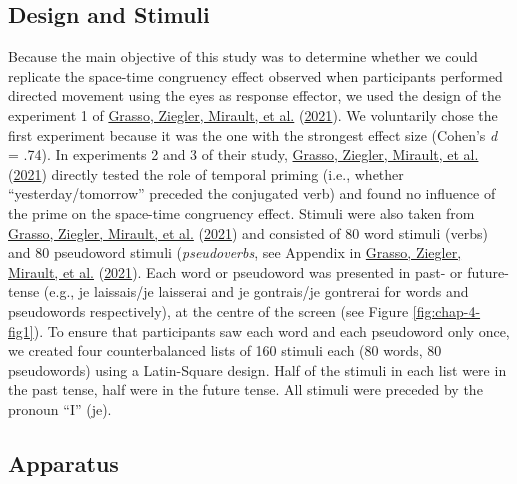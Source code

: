 \documentclass[
  a4paper,12pt,twoside,onecolumn,openright,final,oldfontcommands]{memoir}
\begin{document}
\hypertarget{design-and-stimuli-1}{%
\subsection{Design and Stimuli}\label{design-and-stimuli-1}}

Because the main objective of this study was to determine whether we could replicate the space-time congruency effect observed when participants performed directed movement using the eyes as response effector, we used the design of the experiment 1 of \protect\hyperlink{ref-grasso_as_2021}{Grasso, Ziegler, Mirault, et al.} (\protect\hyperlink{ref-grasso_as_2021}{2021}). We voluntarily chose the first experiment because it was the one with the strongest effect size (Cohen's \emph{d} = .74). In experiments 2 and 3 of their study, \protect\hyperlink{ref-grasso_as_2021}{Grasso, Ziegler, Mirault, et al.} (\protect\hyperlink{ref-grasso_as_2021}{2021}) directly tested the role of temporal priming (i.e., whether ``yesterday/tomorrow'' preceded the conjugated verb) and found no influence of the prime on the space-time congruency effect. Stimuli were also taken from \protect\hyperlink{ref-grasso_as_2021}{Grasso, Ziegler, Mirault, et al.} (\protect\hyperlink{ref-grasso_as_2021}{2021}) and consisted of 80 word stimuli (verbs) and 80 pseudoword stimuli (\emph{pseudoverbs}, see Appendix in \protect\hyperlink{ref-grasso_as_2021}{Grasso, Ziegler, Mirault, et al.} (\protect\hyperlink{ref-grasso_as_2021}{2021}). Each word or pseudoword was presented in past- or future-tense (e.g., je laissais/je laisserai and je gontrais/je gontrerai for words and pseudowords respectively), at the centre of the screen (see Figure \ref{fig:chap-4-fig1}). To ensure that participants saw each word and each pseudoword only once, we created four counterbalanced lists of 160 stimuli each (80 words, 80 pseudowords) using a Latin-Square design. Half of the stimuli in each list were in the past tense, half were in the future tense. All stimuli were preceded by the pronoun ``I'' (je).

\hypertarget{apparatus-1}{%
\subsection{Apparatus}\label{apparatus-1}}
\end{document}
